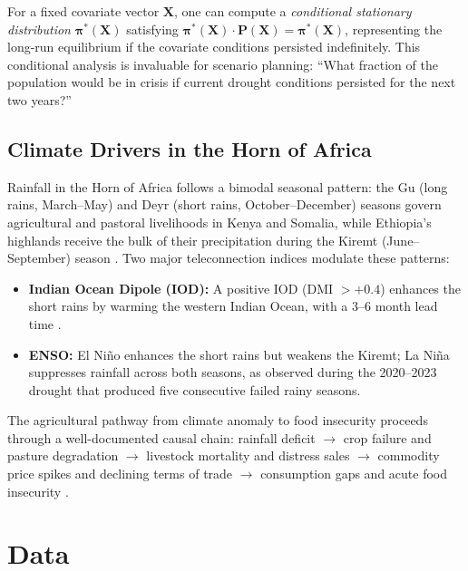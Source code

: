 \documentclass[11pt,letterpaper]{article}
\begin{document}
For a fixed covariate vector $\mathbf{X}$, one can compute a \emph{conditional stationary distribution} $\boldsymbol{\pi}^*(\mathbf{X})$ satisfying $\boldsymbol{\pi}^*(\mathbf{X}) \cdot \mathbf{P}(\mathbf{X}) = \boldsymbol{\pi}^*(\mathbf{X})$, representing the long-run equilibrium if the covariate conditions persisted indefinitely. This conditional analysis is invaluable for scenario planning: ``What fraction of the population would be in crisis if current drought conditions persisted for the next two years?''

\subsection{Climate Drivers in the Horn of Africa}

Rainfall in the Horn of Africa follows a bimodal seasonal pattern: the Gu (long rains, March--May) and Deyr (short rains, October--December) seasons govern agricultural and pastoral livelihoods in Kenya and Somalia, while Ethiopia's highlands receive the bulk of their precipitation during the Kiremt (June--September) season \citep{nicholson2017}. Two major teleconnection indices modulate these patterns:

\begin{itemize}
  \item \textbf{Indian Ocean Dipole (IOD):} A positive IOD (DMI $> +0.4$) enhances the short rains by warming the western Indian Ocean, with a 3--6 month lead time \citep{saji1999}.
  \item \textbf{ENSO:} El Ni\~{n}o enhances the short rains but weakens the Kiremt; La Ni\~{n}a suppresses rainfall across both seasons, as observed during the 2020--2023 drought that produced five consecutive failed rainy seasons.
\end{itemize}

\noindent The agricultural pathway from climate anomaly to food insecurity proceeds through a well-documented causal chain: rainfall deficit $\to$ crop failure and pasture degradation $\to$ livestock mortality and distress sales $\to$ commodity price spikes and declining terms of trade $\to$ consumption gaps and acute food insecurity \citep{funk2015}.


\section{Data}\label{sec:data}
\end{document}
